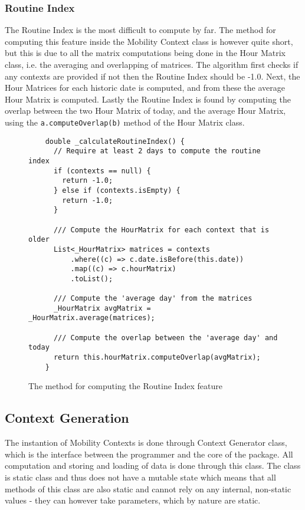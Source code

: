 \subsubsection{Routine Index}
The Routine Index is the most difficult to compute by far. The method for computing this feature inside the Mobility Context class is however quite short, but this is due to all the matrix computations being done in the Hour Matrix class, i.e. the averaging and overlapping of matrices. The algorithm first checks if any contexts are provided if not then the Routine Index should be -1.0. Next, the Hour Matrices for each historic date is computed, and from these the average Hour Matrix is computed. Lastly the Routine Index is found by computing the overlap between the two Hour Matrix of today, and the average Hour Matrix, using the \verb|a.computeOverlap(b)| method of the Hour Matrix class.

\begin{figure}
    \centering
    \begin{verbatim}
    double _calculateRoutineIndex() {
      // Require at least 2 days to compute the routine index
      if (contexts == null) {
        return -1.0;
      } else if (contexts.isEmpty) {
        return -1.0;
      }
    
      /// Compute the HourMatrix for each context that is older
      List<_HourMatrix> matrices = contexts
          .where((c) => c.date.isBefore(this.date))
          .map((c) => c.hourMatrix)
          .toList();
    
      /// Compute the 'average day' from the matrices
      _HourMatrix avgMatrix = _HourMatrix.average(matrices);
    
      /// Compute the overlap between the 'average day' and today
      return this.hourMatrix.computeOverlap(avgMatrix);
    }
    \end{verbatim}
    \caption{The method for computing the Routine Index feature}
    \label{fig:routine-index-code}
\end{figure}

\subsection{Context Generation}
The instantion of Mobility Contexts is done through Context Generator class, which is the interface between the programmer and the core of the package. All computation and storing and loading of data is done through this class. The class is static class and thus does not have a mutable state which means that all methods of this class are also static and cannot rely on any internal, non-static values - they can however take parameters, which by nature are static. 

